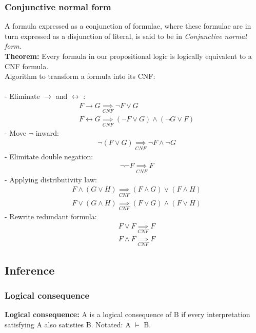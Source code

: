 \documentclass[26pt,fleqn,]{article}
\begin{document}
\subsubsection{Conjunctive normal form}
A formula expressed as a conjunction of formulae, where these formulae are in turn expressed as
a disjunction of literal, is said to be in {\em Conjunctive normal form}.\\
{\bfseries Theorem:} Every formula in our propositional logic is logically equivalent to a CNF
formula.\\
Algorithm to transform a formula into its CNF:\\\\
\indent- Eliminate \(\to\) and \(\leftrightarrow\) :
\begin{align*}
	&F \to G \underset{CNF}{\implies} \neg F \vee G\\
	&F \leftrightarrow G \underset{CNF}{\implies} (\neg F \vee G) \wedge (\neg G \vee F)
\end{align*}
\indent- Move \(\neg\) inward: 
\begin{align*}
	&\neg (F \vee G) \underset{CNF}{\implies} \neg F \wedge \neg G
\end{align*}
\indent- Elimitate double negation:
\begin{align*}
	&\neg \neg F \underset{CNF}{\implies} F
\end{align*}
\indent- Applying distributivity law:
\begin{align*}
	&F \wedge (G \vee H) \underset{CNF}{\implies} (F \wedge G) \vee (F \wedge H)\\
	&F \vee (G \wedge H) \underset{CNF}{\implies} (F \vee G) \wedge (F \vee H)
\end{align*}	
\indent- Rewrite redundant formula:
\begin{align*}	
	&F \vee F \underset{CNF}{\implies} F\\
	&F \wedge F \underset{CNF}{\implies} F
\end{align*}
\subsection{Inference}
\subsubsection{Logical consequence}
{\bfseries Logical consequence:} A is a logical consequence of B if every interpretation 
satisfying A also satisties B. Notated: A \(\models\) B.\\
\end{document}
